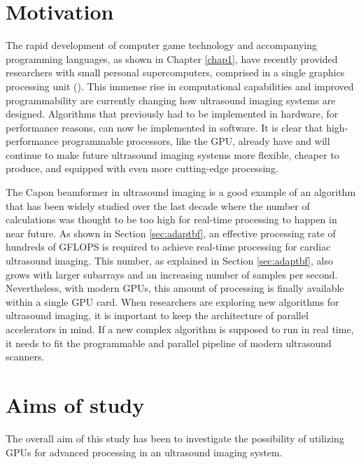 \section{Motivation}
The rapid development of computer game technology and accompanying programming languages, as shown in Chapter \ref{chap1}, have recently provided researchers with small personal supercomputers, comprised in a single graphics processing unit (). %
This immense rise in computational capabilities and improved programmability are currently changing how ultrasound imaging systems are designed. Algorithms that previously had to be implemented in hardware, for performance reasons, can now be implemented in software. 
It is clear that high-performance programmable processors, like the GPU, already have and will continue to make future ultrasound imaging systems more flexible, cheaper to produce, and equipped with even more cutting-edge processing.

The Capon beamformer in ultrasound imaging is a good example of an algorithm that has been widely studied over the last decade where the number of calculations was thought to be too high for real-time processing to happen in near future. As shown in Section \ref{sec:adaptbf}, an effective processing rate of hundreds of GFLOPS is required to achieve real-time processing for cardiac ultrasound imaging. This number, as explained in Section \ref{sec:adaptbf}, also grows with larger subarrays and an increasing number of samples per second. Nevertheless, with modern GPUs, this amount of processing is finally available within a single GPU card. When researchers are exploring new algorithms for ultrasound imaging, it is important to keep the architecture of parallel accelerators in mind. If a new complex algorithm is supposed to run in real time, it needs to fit the programmable and parallel pipeline of modern ultrasound scanners.

\section{Aims of study}
The overall aim of this study has been to investigate the possibility of utilizing GPUs for advanced processing in an ultrasound imaging system. 

